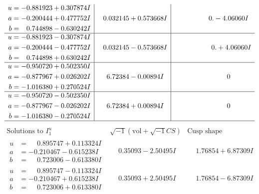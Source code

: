\documentclass[1p]{elsarticle_modified}
\theoremstyle{definition}
\newcommand{\I}{\sqrt{-1}}
\begin{document}
$$\begin{array}{c|c|c}
\begin{aligned}
u &= -0.881923 + 0.307874 I \\
a &= -0.200444 + 0.477752 I \\
b &= \phantom{-}0.744898 - 0.630242 I\end{aligned}
 & \phantom{-}0.032145 + 0.573668 I & \phantom{-0.000000 } 0. - 4.06060 I \\ \hline\begin{aligned}
u &= -0.881923 - 0.307874 I \\
a &= -0.200444 - 0.477752 I \\
b &= \phantom{-}0.744898 + 0.630242 I\end{aligned}
 & \phantom{-}0.032145 - 0.573668 I & \phantom{-0.000000 -}0. + 4.06060 I \\ \hline\begin{aligned}
u &= -0.950720 + 0.502350 I \\
a &= -0.877967 + 0.026202 I \\
b &= -1.016380 + 0.270524 I\end{aligned}
 & \phantom{-}6.72384 - 0.00894 I & \phantom{-0.000000 } 0 \\ \hline\begin{aligned}
u &= -0.950720 - 0.502350 I \\
a &= -0.877967 - 0.026202 I \\
b &= -1.016380 - 0.270524 I\end{aligned}
 & \phantom{-}6.72384 + 0.00894 I & \phantom{-0.000000 } 0\\
 \hline 
 \end{array}$$\newpage$$\begin{array}{c|c|c}  
\text{Solutions to }I^u_{1}& \I (\text{vol} + \sqrt{-1}CS) & \text{Cusp shape}\\
 \hline 
\begin{aligned}
u &= \phantom{-}0.895747 + 0.113324 I \\
a &= -0.210467 - 0.615238 I \\
b &= \phantom{-}0.723006 - 0.613380 I\end{aligned}
 & \phantom{-}0.35093 - 2.50495 I & \phantom{-}1.76854 + 6.87309 I \\ \hline\begin{aligned}
u &= \phantom{-}0.895747 - 0.113324 I \\
a &= -0.210467 + 0.615238 I \\
b &= \phantom{-}0.723006 + 0.613380 I\end{aligned}
 & \phantom{-}0.35093 + 2.50495 I & \phantom{-}1.76854 - 6.87309 I \\ \hline\begin{aligned}

\end{aligned}
\end{array}$$
\end{document}
